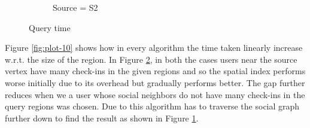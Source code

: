 \begin{figure}[t]
\begin{subfigure}[t]{0.23\textwidth}
		\caption{Source = S2}
		\label{fig:plot-11}
	\end{subfigure}
	\caption{Query time }
	\label{fig:plot1011}
\end{figure}

Figure \ref{fig:plot-10} shows how in every algorithm the time taken linearly increase w.r.t. the size of the region. In Figure \ref{fig:plot1011}, in both the cases users near the source vertex have many check-ins in the given regions and so the spatial index performs worse initially due to its overhead but gradually performs better. The gap further reduces when we a user whose social neighbors do not have many check-ins in the query regions was chosen. Due to this algorithm has to traverse the social graph further down to find the result as shown in Figure \ref{fig:plot-11}.
